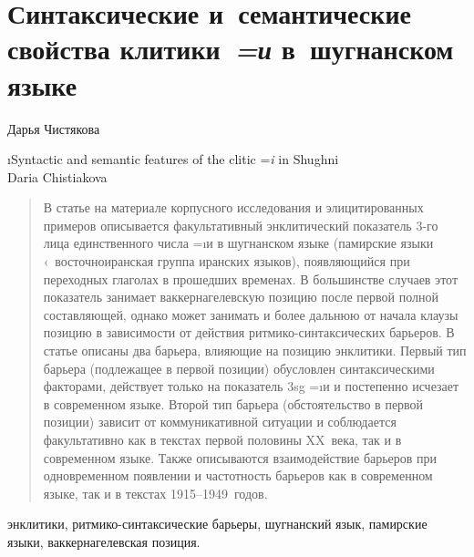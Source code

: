 ﻿\chapter*{Синтаксические и~семантические свойства клитики~\textit{=и} в~шугнанском языке}
\setcounter{section}{0}
\label{chapter-chist-clitic}

\begin{customauthorname}
Дарья Чистякова
\end{customauthorname}

\begin{englishtitle}
\i{Syntactic and semantic features of the clitic =\textit{i} in Shughni\\{\small Daria Chistiakova}}
\end{englishtitle}

\begin{abstract}
В статье на материале корпусного исследования и элицитированных примеров описывается факультативный энклитический показатель 3-го лица единственного числа =\i{и} в шугнанском языке (памирские языки ‹~восточноиранская группа иранских языков), появляющийся при переходных глаголах в прошедших временах. В большинстве случаев этот показатель занимает ваккернагелевскую позицию после первой полной составляющей, однако может занимать и более дальнюю от начала клаузы позицию в зависимости от действия ритмико-синтаксических барьеров. В статье описаны два барьера, влияющие на позицию энклитики. Первый тип барьера (подлежащее в первой позиции) обусловлен синтаксическими факторами, действует только на показатель {\sc 3sg} =\i{и} и постепенно исчезает в современном языке. Второй тип барьера (обстоятельство в первой позиции) зависит от коммуникативной ситуации и соблюдается факультативно как в текстах первой половины XX~века, так и в современном языке. Также описываются взаимодействие барьеров при одновременном появлении и частотность барьеров как в современном языке, так и в текстах 1915–1949~годов.
\end{abstract}

\begin{keywords}
энклитики, ритмико-синтаксические барьеры, шугнанский язык, памирские языки, ваккернагелевская позиция.
\end{keywords}

\vfill

